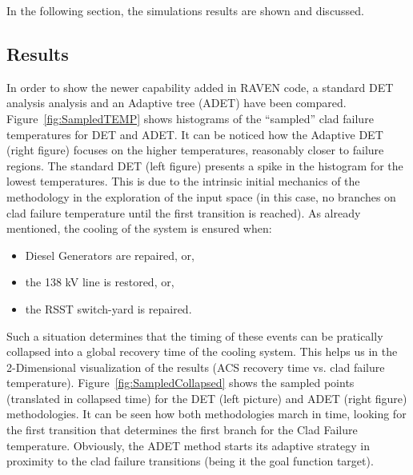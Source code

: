 In the following section, the simulations results are shown and discussed.
\subsection{Results} 
In order to show the newer capability added in RAVEN code, a standard DET~\cite{alfonsiPSA,DETmilestone2013} analysis analysis and an Adaptive tree (ADET) have been compared. 
\\ Figure~\ref{fig:SampledTEMP} shows histograms of the “sampled” clad failure temperatures for DET and ADET. It can be noticed how the Adaptive DET (right figure) focuses on the higher temperatures, reasonably closer to failure regions. The standard DET (left figure) presents a spike in the histogram for the lowest temperatures. This is due to the intrinsic initial mechanics of the methodology in the exploration of the input space (in this case, no branches on clad failure temperature until the first transition is reached). As already mentioned, the cooling of the system is ensured when:
\begin{itemize}
\item Diesel Generators are repaired, or,
\item the 138 kV line is restored, or, 
\item the RSST switch-yard is repaired. 
\end{itemize}
Such a situation determines that the timing of these events can be pratically collapsed into a global recovery time of the cooling system. This helps us in the 2-Dimensional visualization of the results (ACS recovery time vs. clad failure temperature). Figure~\ref{fig:SampledCollapsed} shows the sampled points (translated in collapsed time) for the DET (left picture) and ADET (right figure) methodologies. It can be seen how both methodologies march in time, looking for the first transition that determines the first branch for the Clad Failure temperature. Obviously, the ADET method starts its adaptive strategy in proximity to the clad failure transitions (being it the goal function target).

